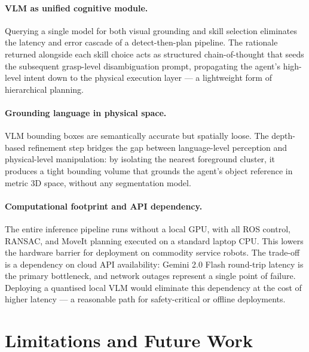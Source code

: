 \documentclass[twocolumn,10pt]{article}
\begin{document}
\paragraph{VLM as unified cognitive module.}
Querying a single model for both visual grounding and skill selection
eliminates the latency and error cascade of a detect-then-plan pipeline.
The rationale returned alongside each skill choice acts as structured
chain-of-thought that seeds the subsequent grasp-level disambiguation
prompt, propagating the agent's high-level intent down to the physical
execution layer — a lightweight form of hierarchical planning.

\paragraph{Grounding language in physical space.}
VLM bounding boxes are semantically accurate but spatially loose.
The depth-based refinement step bridges the gap between language-level
perception and physical-level manipulation: by isolating the nearest
foreground cluster, it produces a tight bounding volume that grounds the
agent's object reference in metric 3D space, without any segmentation model.

\paragraph{Computational footprint and API dependency.}
The entire inference pipeline runs without a local GPU, with all ROS
control, RANSAC, and MoveIt planning executed on a standard laptop CPU.
This lowers the hardware barrier for deployment on commodity service robots.
The trade-off is a dependency on cloud API availability: Gemini 2.0 Flash
round-trip latency is the primary bottleneck, and network outages represent
a single point of failure.
Deploying a quantised local VLM would eliminate this dependency at the cost
of higher latency — a reasonable path for safety-critical or offline deployments.

\section{Limitations and Future Work}
\label{sec:limitations}
\end{document}
